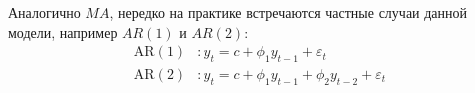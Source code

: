 Аналогично $MA$, нередко на практике встречаются частные случаи данной модели, например $AR(1)$ и 
$AR(2)$:
\begin{align*}
    \text{AR}(1) &: y_t = c + \phi_1 y_{t-1} + \varepsilon_t \\
    \text{AR}(2) &: y_t = c + \phi_1 y_{t-1} + \phi_2 y_{t-2} + \varepsilon_t
\end{align*}







